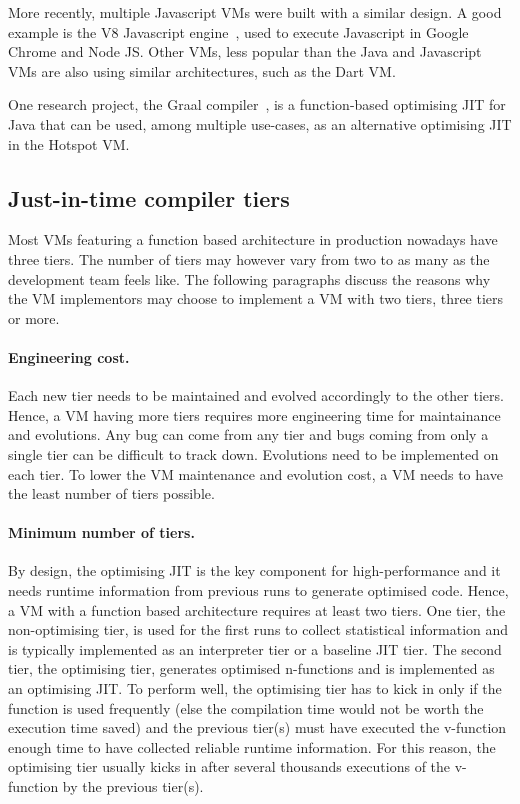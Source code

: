 \documentclass[a4paper,12pt,twoside]{../includes/ThesisStyle}
\begin{document}
More recently, multiple Javascript VMs were built with a similar design. A good example is the V8 Javascript engine~\cite{V8}, used to execute Javascript in Google Chrome and Node JS. Other VMs, less popular than the Java and Javascript VMs are also using similar architectures, such as the Dart VM. 

One research project, the Graal compiler~\cite{Oracle13,Dubo13c}, is a function-based optimising JIT for Java that can be used, among multiple use-cases, as an alternative optimising JIT in the Hotspot VM.

\subsection{Just-in-time compiler tiers}

Most VMs featuring a function based architecture in production nowadays have three tiers. The number of tiers may however vary from two to as many as the development team feels like. The following paragraphs discuss the reasons why the VM implementors may choose to implement a VM with two tiers, three tiers or more.

\paragraph{Engineering cost.} Each new tier needs to be maintained and evolved accordingly to the other tiers. Hence, a VM having more tiers requires more engineering time for maintainance and evolutions. Any bug can come from any tier and bugs coming from only a single tier can be difficult to track down. Evolutions need to be implemented on each tier. To lower the VM maintenance and evolution cost, a VM needs to have the least number of tiers possible.

\paragraph{Minimum number of tiers.} By design, the optimising JIT is the key component for high-performance and it needs runtime information from previous runs to generate optimised code. Hence, a VM with a function based architecture requires at least two tiers. One tier, the non-optimising tier, is used for the first runs to collect statistical information and is typically implemented as an interpreter tier or a baseline JIT tier. The second tier, the optimising tier, generates optimised n-functions and is implemented as an optimising JIT. To perform well, the optimising tier has to kick in only if the function is used frequently (else the compilation time would not be worth the execution time saved) and the previous tier(s) must have executed the v-function enough time to have collected reliable runtime information. For this reason, the optimising tier usually kicks in after several thousands executions of the v-function by the previous tier(s).
\end{document}
